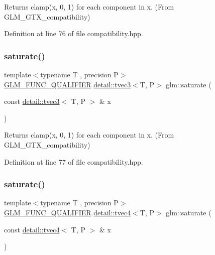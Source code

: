 Returns clamp(x, 0, 1) for each component in x. (From G\+L\+M\+\_\+\+G\+T\+X\+\_\+compatibility) 



Definition at line 76 of file compatibility.\+hpp.

\mbox{\label{group__gtx__compatibility_ga367b1adb1d748e156db972cc92b42483}} 
\subsubsection{\texorpdfstring{saturate()}{saturate()}\hspace{0.1cm}{\footnotesize\ttfamily [3/4]}}
{\footnotesize\ttfamily template$<$typename T , precision P$>$ \\
\hyperlink{setup_8hpp_a33fdea6f91c5f834105f7415e2a64407}{G\+L\+M\+\_\+\+F\+U\+N\+C\+\_\+\+Q\+U\+A\+L\+I\+F\+I\+ER} \hyperlink{structglm_1_1detail_1_1tvec3}{detail\+::tvec3}$<$T, P$>$ glm\+::saturate (\begin{DoxyParamCaption}\item[{const \hyperlink{structglm_1_1detail_1_1tvec3}{detail\+::tvec3}$<$ T, P $>$ \&}]{x }\end{DoxyParamCaption})}



Returns clamp(x, 0, 1) for each component in x. (From G\+L\+M\+\_\+\+G\+T\+X\+\_\+compatibility) 



Definition at line 77 of file compatibility.\+hpp.

\mbox{\label{group__gtx__compatibility_gaad58ab5081f38e91ba5a99a25ba6270c}} 
\subsubsection{\texorpdfstring{saturate()}{saturate()}\hspace{0.1cm}{\footnotesize\ttfamily [4/4]}}
{\footnotesize\ttfamily template$<$typename T , precision P$>$ \\
\hyperlink{setup_8hpp_a33fdea6f91c5f834105f7415e2a64407}{G\+L\+M\+\_\+\+F\+U\+N\+C\+\_\+\+Q\+U\+A\+L\+I\+F\+I\+ER} \hyperlink{structglm_1_1detail_1_1tvec4}{detail\+::tvec4}$<$T, P$>$ glm\+::saturate (\begin{DoxyParamCaption}\item[{const \hyperlink{structglm_1_1detail_1_1tvec4}{detail\+::tvec4}$<$ T, P $>$ \&}]{x }\end{DoxyParamCaption})}



